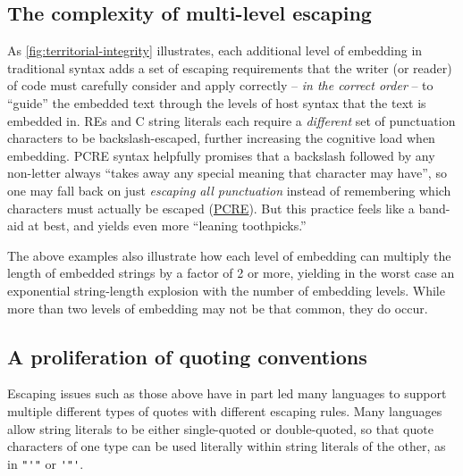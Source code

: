 \subsection{The complexity of multi-level escaping}

As \cref{fig:territorial-integrity} illustrates,
each additional level of embedding in traditional syntax
adds a set of escaping requirements that the writer (or reader) of code
must carefully consider and apply correctly --
\emph{in the correct order} --
to ``guide'' the embedded text
through the levels of host syntax that the text is embedded in.
REs and C string literals each require
a \emph{different} set of punctuation characters to be backslash-escaped,
further increasing the cognitive load when embedding.
PCRE syntax
helpfully promises that a backslash followed by any non-letter
always ``takes away any special meaning that character may have'',
so one may fall back on just \emph{escaping all punctuation}
instead of remembering which characters must actually be escaped
(\href{https://www.pcre.org/original/doc/html/pcrepattern.html}{PCRE}).
But this practice feels like a band-aid at best,
and yields even more ``leaning toothpicks.''

The above examples also illustrate how each level of embedding
can multiply the length of embedded strings by a factor of 2 or more,
yielding in the worst case
an exponential string-length explosion with the number of embedding levels.
While more than two levels of embedding may not be that common,
they do occur.


\subsection{A proliferation of quoting conventions}

Escaping issues such as those above have in part led many languages
to support multiple different types of quotes with different escaping rules.
Many languages allow string literals
to be either single-quoted or double-quoted,
so that quote characters of one type can be used literally
within string literals of the other,
as in \verb|"'"| or \verb|'"'|.

